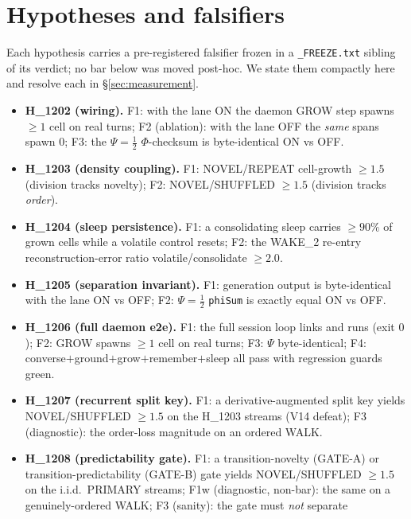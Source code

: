 \documentclass[11pt,a4paper]{article}
\newcommand{\Psihalf}{\Psi=\tfrac12}
\begin{document}
\section{Hypotheses and falsifiers}
\label{sec:hypothesis}

Each hypothesis carries a pre-registered falsifier frozen in a
\texttt{\_FREEZE.txt} sibling of its verdict; no bar below was moved post-hoc.
We state them compactly here and resolve each in \S\ref{sec:measurement}.

\begin{itemize}\itemsep0.35em
\item \textbf{H\_1202 (wiring).} F1: with the lane ON the daemon GROW step
      spawns $\ge 1$ cell on real turns; F2 (ablation): with the lane OFF the
      \emph{same} spans spawn $0$; F3: the $\Psihalf$ $\Phi$-checksum is
      byte-identical ON vs OFF.
\item \textbf{H\_1203 (density coupling).} F1: NOVEL/REPEAT cell-growth
      $\ge 1.5$ (division tracks novelty); F2: NOVEL/SHUFFLED $\ge 1.5$
      (division tracks \emph{order}).
\item \textbf{H\_1204 (sleep persistence).} F1: a consolidating sleep carries
      $\ge 90\%$ of grown cells while a volatile control resets; F2: the
      WAKE\_2 re-entry reconstruction-error ratio volatile/consolidate
      $\ge 2.0$.
\item \textbf{H\_1205 (separation invariant).} F1: generation output is
      byte-identical with the lane ON vs OFF; F2: $\Psihalf$ \texttt{phiSum} is
      exactly equal ON vs OFF.
\item \textbf{H\_1206 (full daemon e2e).} F1: the full session loop links and
      runs (exit $0$); F2: GROW spawns $\ge 1$ cell on real turns; F3: $\Psi$
      byte-identical; F4: converse$+$ground$+$grow$+$remember$+$sleep all pass
      with regression guards green.
\item \textbf{H\_1207 (recurrent split key).} F1: a derivative-augmented split
      key yields NOVEL/SHUFFLED $\ge 1.5$ on the H\_1203 streams (V14 defeat);
      F3 (diagnostic): the order-loss magnitude on an ordered WALK.
\item \textbf{H\_1208 (predictability gate).} F1: a transition-novelty (GATE-A)
      or transition-predictability (GATE-B) gate yields NOVEL/SHUFFLED $\ge 1.5$
      on the i.i.d.\ PRIMARY streams; F1w (diagnostic, non-bar): the same on a
      genuinely-ordered WALK; F3 (sanity): the gate must \emph{not} separate

\end{itemize}
\end{document}
